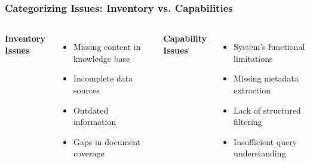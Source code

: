 \begin{frame}
    \frametitle{Categorizing Issues: Inventory vs. Capabilities}
    
    \begin{columns}
        \textbf{Inventory Issues}
        \begin{itemize}
            \item Missing content in knowledge base
            \item Incomplete data sources
            \item Outdated information
            \item Gaps in document coverage
        \end{itemize}
        
        \textbf{Capability Issues}
        \begin{itemize}
            \item System's functional limitations
            \item Missing metadata extraction
            \item Lack of structured filtering
            \item Insufficient query understanding
        \end{itemize}
    \end{columns}
    
    \begin{center}
    \end{center}
\end{frame}

